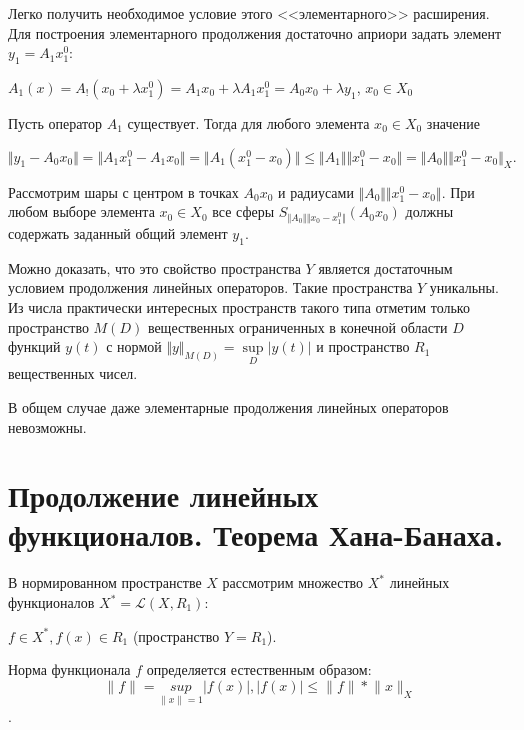 \documentclass[12pt,a4paper,titlepage,oneside]{book}
\theoremstyle{definition}
\theoremstyle{plain}
\theoremstyle{remark}
\theoremstyle{remark}
\theoremstyle{remark}
\theoremstyle{remark}
\theoremstyle{plain}
\theoremstyle{plain}
\begin{document}
Легко получить необходимое условие этого <<элементарного>> расширения. Для построения элементарного продолжения достаточно априори задать элемент $y_1 = A_1 x_1^0$:
\begin{center}
$A_1(x) = A_!(x_0+\lambda x_1^0) = A_1x_0+\lambda A_1x_1^0 = A_0 x_0 + \lambda y_1$, $x_0 \in X_0$
\end{center}

Пусть оператор $A_1$ существует. Тогда для любого элемента $x_0 \in X_0$ значение
\begin{center}
$\Vert y_1 -A_0x_0 \Vert = \Vert A_1x_1^0 - A_1x_0 \Vert = \Vert A_1(x_1^0 - x_0) \Vert \leqslant \Vert A_1 \Vert \Vert x_1^0 - x_0 \Vert = \Vert A_0 \Vert \Vert x_1^0 - x_0 \Vert_X.$
\end{center}

Рассмотрим шары с центром в точках $A_0x_0$ и радиусами $\Vert A_0 \Vert \Vert x_1^0 - x_0 \Vert$. При любом выборе элемента $x_0 \in X_0$ все сферы $S_{\Vert A_0 \Vert \Vert x_0 - x_1^0 \Vert}(A_0x_0)$ должны содержать заданный общий элемент $y_1$.

Можно доказать, что это свойство пространства $Y$ является достаточным условием продолжения линейных операторов. Такие пространства $Y$ уникальны. Из числа практически интересных пространств такого типа отметим только пространство $M(\mathit{D})$ вещественных ограниченных в конечной области $D$ функций $y(t)$ с нормой $\Vert y\Vert_{M(D)} = \sup \limits_D\lvert y(t) \rvert$ и пространство $R_1$ вещественных чисел.

В общем случае даже элементарные продолжения линейных операторов невозможны.

\section{Продолжение линейных функционалов. Теорема Хана-Банаха.}
В нормированном пространстве $X$ рассмотрим множество $X^*$ линейных функционалов $X^*=\mathcal{L}(X, R_1):$
\begin{center}
$ f\in X^*, f(x)\in R_1$ (пространство $Y=R_1$).
\end{center}
Норма функционала $f$ определяется естественным образом:
$$\lVert f \rVert = \underset{\lVert x \rVert=1}{sup} |f(x)|, |f(x)| \leqslant \lVert f \rVert * \lVert x \rVert_X $$.
\end{document}
